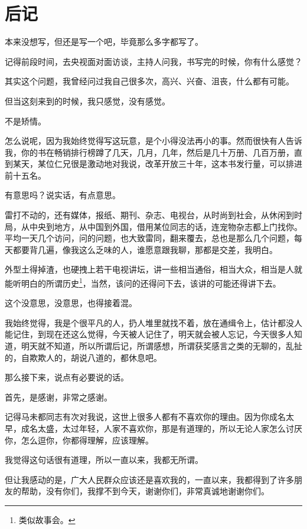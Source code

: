 \chapter*{后记}
\ifnum{}
	\begin{multicols}{\theparacolNo}
		\fi
		本来没想写，但还是写一个吧，毕竟那么多字都写了。

		记得前段时间，去央视面对面访谈，主持人问我，书写完的时候，你有什么感觉？

		其实这个问题，我曾经问过我自己很多次，高兴、兴奋、沮丧，什么都有可能。

		但当这刻来到的时候，我只感觉，没有感觉。

		不是矫情。

		怎么说呢，因为我始终觉得写这玩意，是个小得没法再小的事。然而很快有人告诉我，你的书在畅销排行榜蹲了几天，几月，几年，然后是几十万册、几百万册，直到某天，某位仁兄很是激动地对我说，改革开放三十年，这本书发行量，可以排进前十五名。

		有意思吗？说实话，有点意思。

		雷打不动的，还有媒体，报纸、期刊、杂志、电视台，从时尚到社会，从休闲到时局，从中央到地方，从中国到外国，借用某位同志的话，连宠物杂志都上门找你。平均一天几个访问，问的问题，也大致雷同，翻来覆去，总也是那么几个问题，每天都要背几遍，像我这么乏味的人，谁愿意跟我聊，那都是交差，我明白。

		外型土得掉渣，也硬拽上若干电视讲坛，讲一些相当通俗，相当大众，相当是人就能听明白的所谓历史\footnote{类似故事会。}，当然，该问的还得问下去，该讲的可能还得讲下去。

		这个没意思，没意思，也得接着混。

		我始终觉得，我是个很平凡的人，扔人堆里就找不着，放在通缉令上，估计都没人能记住，到现在还这么觉得，今天被人记住了，明天就会被人忘记，今天很多人知道，明天就不知道，所以所谓后记，所谓感想，所谓获奖感言之类的无聊的，乱扯的，自欺欺人的，胡说八道的，都休息吧。

		那么接下来，说点有必要说的话。

		首先，是感谢，非常之感谢。

		记得马未都同志有次对我说，这世上很多人都有不喜欢你的理由。因为你成名太早，成名太盛，太过年轻，人家不喜欢你，那是有道理的，所以无论人家怎么讨厌你，怎么逗你，你都得理解，应该理解。

		我觉得这句话很有道理，所以一直以来，我都无所谓。

		但让我感动的是，广大人民群众应该还是喜欢我的，一直以来，我都得到了许多朋友的帮助，没有你们，我撑不到今天，谢谢你们，非常真诚地谢谢你们。


\end{multicols}
